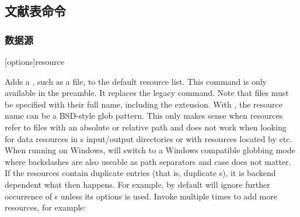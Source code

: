 \subsection{文献表命令}
\label{use:bib}

\subsubsection{数据源}%
\label{use:bib:res}

\begin{ltxsyntax}

[options]{resource}


Adds a , such as a  file, to the default resource list. This command is only available in the preamble. It replaces the  legacy command. Note that files must be specified with their full name, including the extension. With \biber, the resource name can be a BSD-style glob pattern. This only makes sense when resources refer to files with an absolute or relative path and does not work when looking for data resources in \biber s input/output directories or with resources located by  etc. When running on Windows, \biber will switch to a Windows compatible globbing mode where backslashes are also useable as path separators and case does not matter. If the resources contain duplicate entries (that is, duplicate s), it is backend dependent what then happens. For example, by default \biber will ignore further occurrence of s unless its  options is used. Invoke  multiple times to add more resources, for example:


\end{ltxsyntax}
